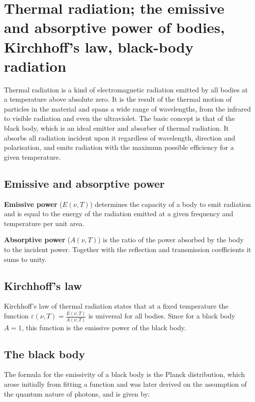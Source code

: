 \section{Thermal radiation; the emissive and absorptive power of bodies, Kirchhoff's law, black-body radiation}

Thermal radiation is a kind of electromagnetic radiation emitted by all bodies at a temperature above absolute zero. It is the result of the thermal motion of particles in the material and spans a wide range of wavelengths, from the infrared to visible radiation and even the ultraviolet. The basic concept is that of the black body, which is an ideal emitter and absorber of thermal radiation. It absorbs all radiation incident upon it regardless of wavelength, direction and polarisation, and emits radiation with the maximum possible efficiency for a given temperature.

\subsection{Emissive and absorptive power}

\textbf{Emissive power} ($E(\nu, T)$) determines the capacity of a body to emit radiation and is equal to the energy of the radiation emitted at a given frequency and temperature per unit area.

\textbf{Absorptive power} ($A(\nu,T)$) is the ratio of the power absorbed by the body to the incident power. Together with the reflection and transmission coefficients it sums to unity.

\subsection{Kirchhoff's law}

Kirchhoff's law of thermal radiation states that at a fixed temperature the function $\varepsilon(\nu,T)=\frac{E(\nu,T)}{A(\nu,T)}$ is universal for all bodies. Since for a black body $A=1$, this function is the emissive power of the black body.

\subsection{The black body}

The formula for the emissivity of a black body is the Planck distribution, which arose initially from fitting a function and was later derived on the assumption of the quantum nature of photons, and is given by:

